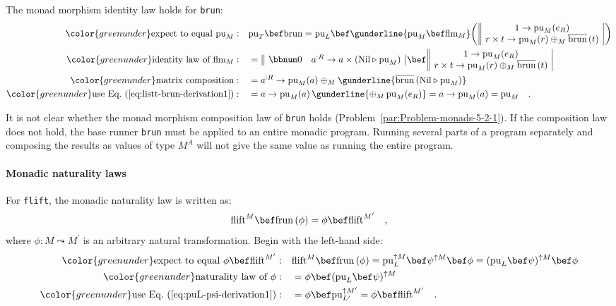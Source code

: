 The monad morphism identity law holds for \lstinline!brun!:
\begin{align*}
{\color{greenunder}\text{expect to equal }\text{pu}_{M}:}\quad & \text{pu}_{T}\bef\text{brun}=\text{pu}_{L}\bef\gunderline{\text{pu}_{M}\bef\text{flm}_{M}}\bigg(\,\begin{array}{||c|}
1\rightarrow\text{pu}_{M}(e_{R})\\
r\times t\rightarrow\text{pu}_{M}(r)\oplus_{M}\overline{\text{brun}}\,(t)
\end{array}\,\bigg)\\
{\color{greenunder}\text{identity law of }\text{flm}_{M}:}\quad & =\,\begin{array}{||cc|}
\bbnum 0 & a^{:R}\rightarrow a\times(\text{Nil}\triangleright\text{pu}_{M})\end{array}\,\bef\,\begin{array}{||c|}
1\rightarrow\text{pu}_{M}(e_{R})\\
r\times t\rightarrow\text{pu}_{M}(r)\oplus_{M}\overline{\text{brun}}\,(t)
\end{array}\\
{\color{greenunder}\text{matrix composition}:}\quad & =a^{:R}\rightarrow\text{pu}_{M}(a)\oplus_{M}\gunderline{\overline{\text{brun}}\,(\text{Nil}\triangleright\text{pu}_{M})}\\
{\color{greenunder}\text{use Eq.~(\ref{eq:listt-brun-derivation1})}:}\quad & =a\rightarrow\text{pu}_{M}(a)\,\gunderline{\oplus_{M}\,\text{pu}_{M}(e_{R})}=a\rightarrow\text{pu}_{M}(a)=\text{pu}_{M}\quad.
\end{align*}

It is not clear whether the monad morphism composition law of \lstinline!brun!
holds (Problem~\ref{par:Problem-monads-5-2-1}). If the composition
law does not hold, the base runner \lstinline!brun! must be applied
to an entire monadic program. Running several parts of a program separately
and composing the results as values of type $M^{A}$ will not give
the same value as running the entire program.

\paragraph{Monadic naturality laws}

For \lstinline!flift!, the monadic naturality law is written as:
\[
\text{flift}^{M}\bef\text{frun}\,(\phi)=\phi\bef\text{flift}^{M^{\prime}}\quad,
\]
where $\phi:M\leadsto M^{\prime}$ is an arbitrary natural transformation.
Begin with the left-hand side:
\begin{align*}
{\color{greenunder}\text{expect to equal }\phi\bef\text{flift}^{M^{\prime}}:}\quad & \text{flift}^{M}\bef\text{frun}\,(\phi)=\text{pu}_{L}^{\uparrow M}\bef\psi^{\uparrow M}\bef\phi=(\text{pu}_{L}\bef\psi)^{\uparrow M}\bef\phi\\
{\color{greenunder}\text{naturality law of }\phi:}\quad & =\phi\bef(\text{pu}_{L}\bef\psi)^{\uparrow M}\\
{\color{greenunder}\text{use Eq.~(\ref{eq:puL-psi-derivation1})}:}\quad & =\phi\bef\text{pu}_{L^{\prime}}^{\uparrow M^{\prime}}=\phi\bef\text{flift}^{M^{\prime}}\quad.
\end{align*}


